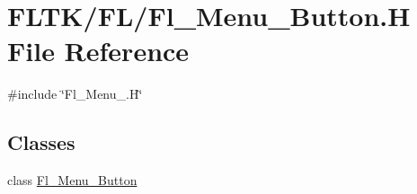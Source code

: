 \hypertarget{_fl___menu___button_8_h}{}\section{F\+L\+T\+K/\+F\+L/\+Fl\+\_\+\+Menu\+\_\+\+Button.H File Reference}
\label{_fl___menu___button_8_h}
{\ttfamily \#include \char`\"{}Fl\+\_\+\+Menu\+\_\+.\+H\char`\"{}}\newline
\subsection*{Classes}
\begin{DoxyCompactItemize}
\item 
class \hyperlink{class_fl___menu___button}{Fl\+\_\+\+Menu\+\_\+\+Button}
\end{DoxyCompactItemize}

